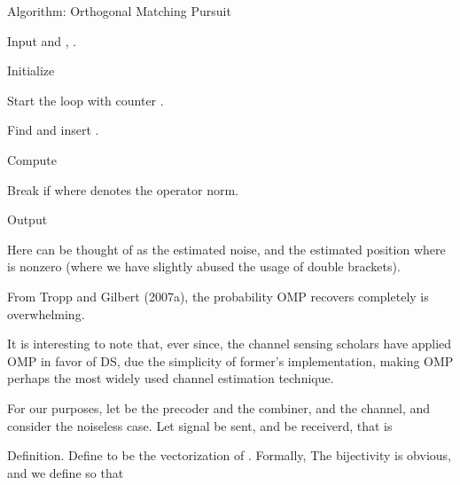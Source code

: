 \Result
{Algorithm: Orthogonal Matching Pursuit}
{
\startitemize[n]
\item Input  and , .
\item Initialize
\item Start the loop with counter .
\item Find
and insert .
\item Compute
\item Break if
where  denotes the operator norm.
\item Output 
\stopitemize
}
Here  can be thought of as the estimated noise, and  the estimated position where  is nonzero (where we have slightly abused the usage of double brackets).

From Tropp and Gilbert (2007a), the probability OMP recovers  completely is overwhelming.

It is interesting to note that, ever since, the channel sensing scholars have applied OMP in favor of DS, due the simplicity of former's implementation, making OMP perhaps the most widely used channel estimation technique.

For our purposes, let  be the precoder and  the combiner, and  the channel, and consider the noiseless case.
Let signal  be sent, and  be receiverd, that is


\Result
{Definition.}
{
Define  to be the vectorization of .
Formally,
The bijectivity is obvious, and we define  so that
}

